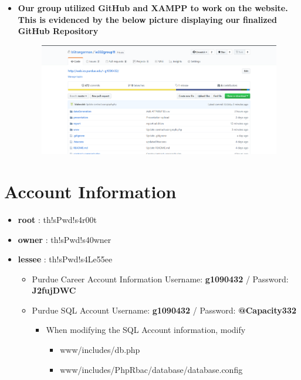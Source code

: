 \begin{itemize}
\item \textbf{Our group utilized GitHub and XAMPP to work on the website.  This is evidenced by the below picture displaying our finalized GitHub Repository}
\begin{figure}
\centering
\includegraphics[width=\textwidth]{Phase_3/github}
\end{figure}
\end{itemize}

\section*{Account Information}
\begin{itemize}
\item \textbf{root} : th!sPwd!s4r00t
\item \textbf{owner} : th!sPwd!s40wner
\item \textbf{lessee} : th!sPwd!s4Le55ee
\begin{itemize}
    \item Purdue Career Account Information Username: \textbf{g1090432} / Password: \textbf{J2fujDWC}
\item Purdue SQL Account Username: \textbf{g1090432} / Password: \textbf{@Capacity332}
\begin{itemize}
\item When modifying the SQL Account information, modify 
\begin{itemize}
\item www/includes/db.php
\item www/includes/PhpRbac/database/database.config

\end{itemize}

\end{itemize}
\end{itemize}
\end{itemize}

\newpage
\tableofcontents
\newpage
{}

